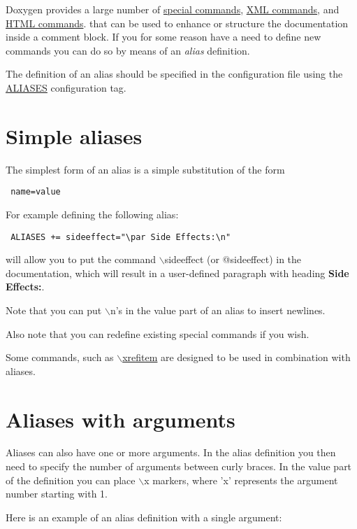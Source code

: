 Doxygen provides a large number of \hyperlink{commands}{special commands}, \hyperlink{xmlcmds}{XML commands}, and \hyperlink{htmlcmds}{HTML commands}. that can be used to enhance or structure the documentation inside a comment block. If you for some reason have a need to define new commands you can do so by means of an {\em alias\/} definition.

The definition of an alias should be specified in the configuration file using the \hyperlink{config_cfg_aliases}{ALIASES} configuration tag.\hypertarget{custcmd_custcmd_simple}{}\section{Simple aliases}\label{custcmd_custcmd_simple}
The simplest form of an alias is a simple substitution of the form 

\footnotesize\begin{verbatim}
 name=value
\end{verbatim}
\normalsize
 For example defining the following alias: 

\footnotesize\begin{verbatim}
 ALIASES += sideeffect="\par Side Effects:\n" 
\end{verbatim}
\normalsize
 will allow you to put the command $\backslash$sideeffect (or @sideeffect) in the documentation, which will result in a user-defined paragraph with heading {\bf Side Effects:}.

Note that you can put $\backslash$n's in the value part of an alias to insert newlines.

Also note that you can redefine existing special commands if you wish.

Some commands, such as \hyperlink{commands_cmdxrefitem}{$\backslash$xrefitem} are designed to be used in combination with aliases.\hypertarget{custcmd_custcmd_complex}{}\section{Aliases with arguments}\label{custcmd_custcmd_complex}
Aliases can also have one or more arguments. In the alias definition you then need to specify the number of arguments between curly braces. In the value part of the definition you can place $\backslash$x markers, where 'x' represents the argument number starting with 1.

Here is an example of an alias definition with a single argument: 

